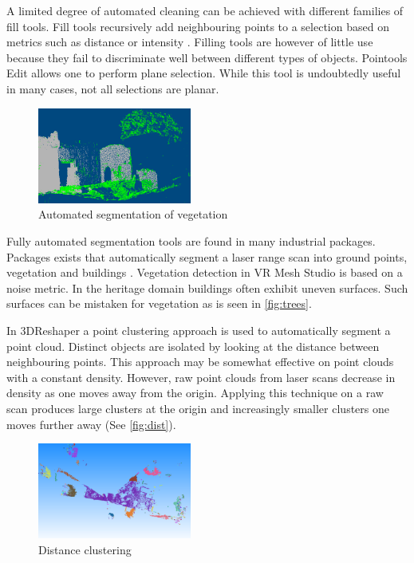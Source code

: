 \documentclass[10pt,twocolumn]{article}
\begin{document}
A limited degree of automated cleaning can be achieved with different families of fill tools. Fill tools recursively add neighbouring points to a selection based on metrics such as distance or intensity \cite{Pointools2012}. Filling tools are however of little use because they fail to discriminate well between different types of objects. Pointools Edit \cite{Pointools2012} allows one to perform plane selection. While this tool is undoubtedly useful in many cases, not all selections are planar.

\begin{figure}[htb]
\centering
\includegraphics[width=0.45\textwidth]{pics/vrmesh-veg.png}
\caption{Automated segmentation of vegetation \cite{VirtualGrid2012}}
\label{fig:trees}
\end{figure}

Fully automated segmentation tools are found in many industrial packages. Packages exists that automatically segment a laser range scan into ground points, vegetation and buildings \cite{Terrasolid2012,VirtualGrid2012,Carlson2012}. Vegetation detection in VR Mesh Studio \cite{Terrasolid2012} is based on a noise metric. In the heritage domain buildings often exhibit uneven surfaces. Such surfaces can be mistaken for vegetation as is seen in \autoref{fig:trees}.

In 3DReshaper \cite{Technodigit2012} a point clustering approach is used to automatically segment a point cloud. Distinct objects are isolated by looking at the distance between neighbouring points. This approach may be somewhat effective on point clouds with a constant density. However, raw point clouds from laser scans decrease in density as one moves away from the origin. Applying this technique on a raw scan produces large clusters at the origin and increasingly smaller clusters one moves further away (See \autoref{fig:dist}).

\begin{figure}[htb]
\centering
\includegraphics[width=0.45\textwidth]{pics/clustering.png}
\caption{Distance clustering \cite{Technodigit2012}}
\label{fig:dist}
\end{figure}
\end{document}
